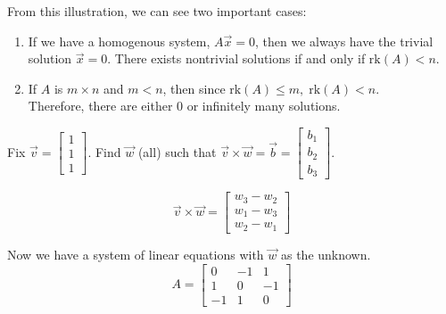 \documentclass[../main.tex]{subfiles}
\begin{document}
From this illustration, we can see two important cases:
\begin{enumerate}
    \item If we have a homogenous system, \( A \vec{x}=0 \), then we always have the trivial solution \( \vec{x}=0 \).
        There exists nontrivial solutions if and only if \( \text{rk}(A)<n \).
    \item If \( A \) is \( m \times n \) and \( m < n \), then since \( \text{rk}(A) \leq m, \; \text{rk}(A) < n \). \\
        Therefore, there are either 0 or infinitely many solutions.
\end{enumerate}

\begin{example}[]
    Fix \( \vec{v} =
    \begin{bmatrix}
        1 \\
        1 \\
        1
    \end{bmatrix} \).
    Find \( \vec{w} \) (all) such that
    \( \vec{v} \times \vec{w} = \vec{b} =
    \begin{bmatrix}
        b_1 \\
        b_2 \\
        b_3
    \end{bmatrix} \).

    \[ \vec{v} \times \vec{w} = \begin{bmatrix}
        w_3 - w_2 \\
        w_1 - w_3 \\
        w_2 - w_1
    \end{bmatrix} \]

    Now we have a system of linear equations with \( \vec{w} \) as the unknown.
    \[ A =
        \begin{bmatrix}
            0 & -1 & 1 \\
            1 & 0 & -1 \\
            -1 & 1 & 0
        \end{bmatrix}
    \]


\end{example}
\end{document}
